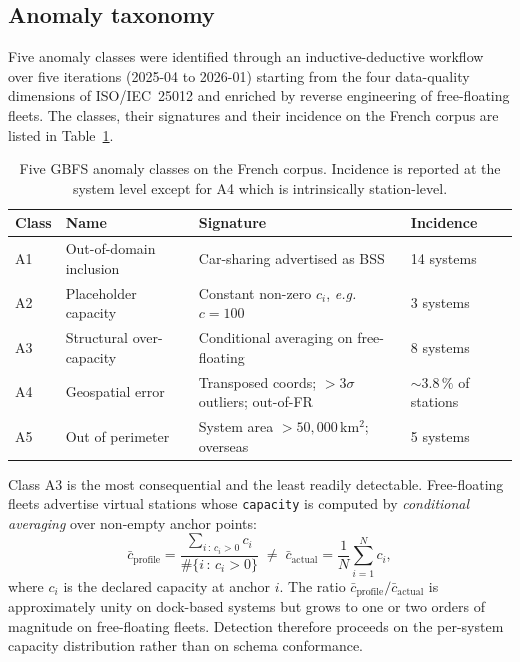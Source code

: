 \documentclass[11pt,a4paper]{article}
\newcommand{\eg}{\emph{e.g.}}
\begin{document}
\subsection{Anomaly taxonomy}
Five anomaly classes were identified through an inductive-deductive
workflow over five iterations (2025-04 to 2026-01) starting from the
four data-quality dimensions of ISO/IEC~25012 \cite{ISO25012} and
enriched by reverse engineering of free-floating fleets. The classes,
their signatures and their incidence on the French corpus are listed
in Table~\ref{tab:anomalies}.

\begin{table}[ht]
\centering
\caption{Five GBFS anomaly classes on the French corpus. Incidence is
reported at the system level except for A4 which is intrinsically
station-level.}
\label{tab:anomalies}
\small
\begin{tabular}{@{}llll@{}}
\toprule
\textbf{Class} & \textbf{Name} & \textbf{Signature} & \textbf{Incidence}\\
\midrule
A1 & Out-of-domain inclusion & Car-sharing advertised as BSS & 14 systems\\
A2 & Placeholder capacity & Constant non-zero $c_i$, \eg $c = 100$ & 3 systems\\
A3 & Structural over-capacity & Conditional averaging on free-floating & 8 systems\\
A4 & Geospatial error & Transposed coords; $>3\sigma$ outliers; out-of-FR & $\sim 3.8\,\%$ of stations\\
A5 & Out of perimeter & System area $>50{,}000$\,km$^2$; overseas & 5 systems\\
\bottomrule
\end{tabular}
\end{table}

Class A3 is the most consequential and the least readily detectable.
Free-floating fleets advertise virtual stations whose
\texttt{capacity} is computed by \emph{conditional averaging} over
non-empty anchor points:
\begin{equation}
\bar{c}_{\text{profile}}
= \frac{\sum_{i\,:\,c_i > 0} c_i}{\#\{i\,:\,c_i > 0\}}
\;\neq\;
\bar{c}_{\text{actual}}
= \frac{1}{N}\sum_{i=1}^{N} c_i,
\label{eq:a3-bias}
\end{equation}
where $c_i$ is the declared capacity at anchor $i$. The ratio
$\bar{c}_{\text{profile}} / \bar{c}_{\text{actual}}$ is approximately
unity on dock-based systems but grows to one or two orders of magnitude
on free-floating fleets. Detection therefore proceeds on the
per-system capacity distribution rather than on schema conformance.
\end{document}
